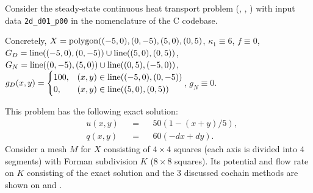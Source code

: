 \begin{example}
  \label{cmc/diffusion/continuous/steady_state/examples/2d_d01_p00-example}
  Consider the steady-state continuous heat transport problem
  (,
   ,
   )
  with input data \verb|2d_d01_p00| in the nomenclature of the C codebase.

  Concretely,
    $X = {\rm polygon}((-5, 0), (0, -5), (5, 0), (0, 5)$,
    $\kappa_1 \equiv 6$,
    $f \equiv 0$,
    $G_D = {\rm line}((-5, 0), (0, -5)) \cup {\rm line}((5, 0), (0, 5))$,
    $G_N = {\rm line}((0, -5), (5, 0)) \cup {\rm line}((0, 5), (-5, 0))$,
    $g_D(x, y) =
      \begin{cases}
        100, & (x, y) \in {\rm line}((-5, 0), (0, -5)) \\
        0, & (x, y) \in {\rm line}((5, 0), (0, 5))
      \end{cases}$,
    $g_N \equiv 0$.

  This problem has the following exact solution:
  \begin{subequations}
    \begin{alignat}{3}
      & u(x, y) && = && 50 (1 - (x + y) / 5), \\
      & q(x, y) && = && 60 (- d x + d y).
    \end{alignat}
  \end{subequations}
  Consider a mesh $M$ for $X$ consisting of $4 \times 4$ squares (each axis is
  divided into $4$ segments) with Forman subdivision $K$ ($8 \times 8$ squares).
  Its potential and flow rate on $K$ consisting of the exact solution and the
  $3$ discussed cochain methods are shown on
  and
  .
\end{example}
